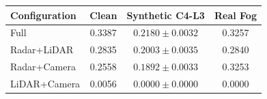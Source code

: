 \begin{tabular}{lccc}
\toprule
Configuration & Clean & Synthetic C4-L3 & Real Fog \\
\midrule
Full & 0.3387 & $0.2180 \pm 0.0032$ & 0.3257 \\
Radar+LiDAR & 0.2835 & $0.2003 \pm 0.0035$ & 0.2840 \\
Radar+Camera & 0.2558 & $0.1892 \pm 0.0033$ & 0.3253 \\
LiDAR+Camera & 0.0056 & $0.0000 \pm 0.0000$ & 0.0000 \\
\bottomrule
\end{tabular}
